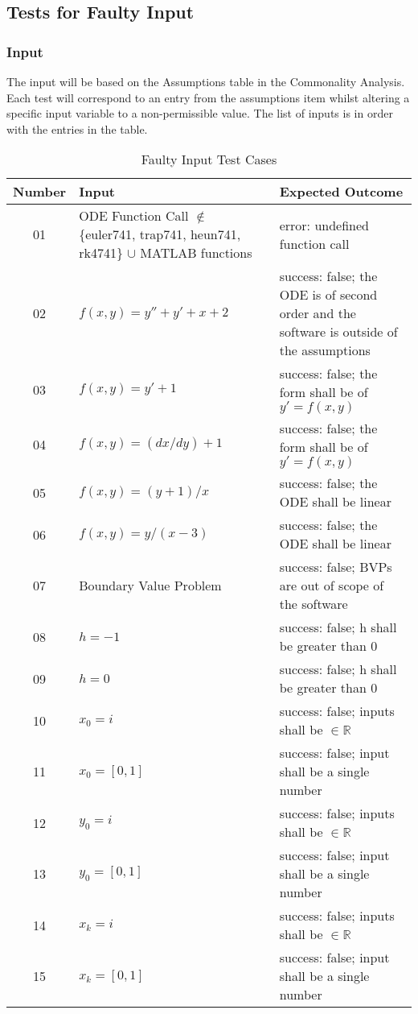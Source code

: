 \documentclass[12pt, titlepage]{article}
\begin{document}
\subsection{Tests for Faulty Input}

\subsubsection{Input}
		
The input will be based on the Assumptions table in the Commonality Analysis. Each test will correspond to an 
entry from the assumptions item whilst altering a specific input variable to a non-permissible value. The list of 
inputs is in order with the entries in the table.

\begin{table} [H]
  \caption{Faulty Input Test Cases}
  \label{Table:Table_FaultyInputs}  
\begin{tabular}{|c|p{6cm}|p{8cm}|}
  \hline	
  \textbf{Number} & \textbf{Input} &\textbf{Expected Outcome}\\
  \hline 
  01 & ODE Function Call $\mathbb{\notin}$ \{euler741, trap741, heun741, rk4741\} $\mathbb{\cup}$ 
  MATLAB functions & error: undefined function call\\ \hline
  02& $f(x, y) = y'' + y' + x + 2$ & success: false; the ODE is of second order and the software is outside of the assumptions\\ \hline
  03& $f(x, y) = y' + 1$ & success: false; the form shall be of $y' = f(x, y)$\\ \hline
  04& $f(x, y) = (dx/dy) + 1$ & success: false; the form shall be of $y' = f(x, y)$\\ \hline
  05& $f(x, y) = (y + 1) / x$ & success: false; the ODE shall be linear\\ \hline
  06& $f(x, y) = y/(x-3)$ & success: false; the ODE shall be linear\\ \hline
  07& Boundary Value Problem & success: false; BVPs are out of scope of the software\\ \hline
  08& $h = -1$ & success: false; h shall be greater than 0\\ \hline
  09& $h = 0$ & success: false; h shall be greater than 0\\ \hline
  10& $x_0 = i$ & success: false; inputs shall be $\in \mathbb{R}$\\ \hline 
  11& $x_0 = [0, 1]$ & success: false; input shall be a single number\\ \hline 
  12& $y_0 = i$ & success: false; inputs shall be $\in \mathbb{R}$\\ \hline 
  13& $y_0 = [0, 1]$ & success: false; input shall be a single number\\ \hline
  14& $x_k = i$ & success: false; inputs shall be $\in \mathbb{R}$\\ \hline 
  15& $x_k = [0, 1]$ & success: false; input shall be a single number\\ \hline

\end{tabular}\\
\end{table}
\end{document}
